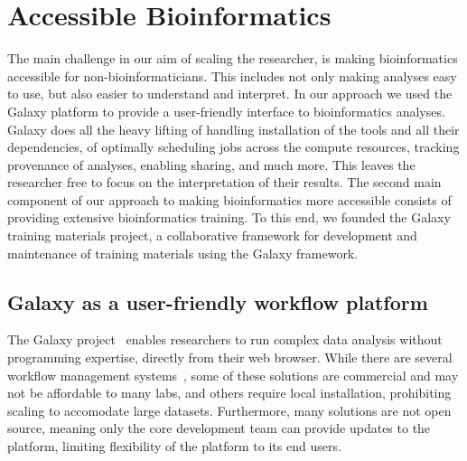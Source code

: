 

\section{Accessible Bioinformatics}

The main challenge in our aim of scaling the researcher, is making bioinformatics accessible for non-bioinformaticians. This includes not only making analyses easy to use, but also easier to understand and interpret.
In our approach we used the Galaxy platform to provide a user-friendly interface to bioinformatics analyses. Galaxy does all the heavy lifting of handling installation of the tools and all their dependencies, of optimally scheduling jobs across the compute resources, tracking provenance of analyses, enabling sharing, and much more. This leaves the researcher free to focus on the interpretation of their results.
The second main component of our approach to making bioinformatics more accessible consists of providing extensive bioinformatics training. To this end, we founded the Galaxy training materials project, a collaborative framework for development and maintenance of training materials using the Galaxy framework.


\subsection{Galaxy as a user-friendly workflow platform}

The Galaxy project~\cite{giardine2005galaxy,blankenberg2010galaxy,afgan2016galaxy} enables researchers to run complex data analysis without programming expertise, directly from their web browser. While there are several workflow management systems~\cite{clcbio,oinn2004taverna,onlinehpc,anduril,molgenis}, some of these solutions are commercial and may not be affordable to many labs, and others require local installation, prohibiting scaling to accomodate large datasets. Furthermore, many solutions are not open source, meaning only the core development team can provide updates to the platform, limiting flexibility of the platform to its end users.

